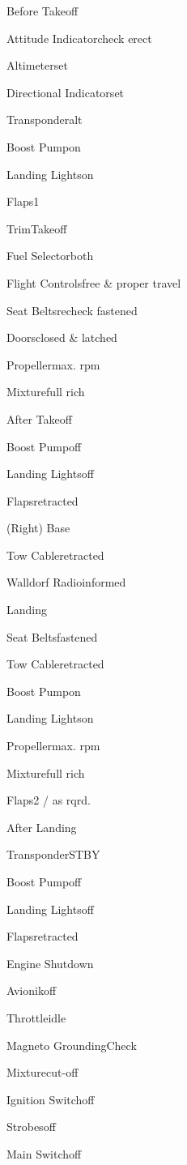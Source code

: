 \begin{checklist}{Before Takeoff}
  \item{Attitude Indicator}{check erect}
  \item{Altimeter}{set}
  \item{Directional Indicator}{set}
  \item{Transponder}{alt}
  \item{Boost Pump}{on}
  \item{Landing Lights}{on}
  \item{Flaps}{1}
  \item{Trim}{Takeoff}
  \item{Fuel Selector}{both}
  \item{Flight Controls}{free \& proper travel}
  \item{Seat Belts}{recheck fastened}
  \item{Doors}{closed \& latched}
  \item{Propeller}{max. rpm}
  \item{Mixture}{full rich}
\end{checklist}

\begin{checklist}{After Takeoff}
  \item{Boost Pump}{off}
  \item{Landing Lights}{off}
  \item{Flaps}{retracted}
\end{checklist}

\begin{checklist}{(Right) Base}
  \item{Tow Cable}{retracted}
  \item{Walldorf Radio}{informed}
\end{checklist}

\begin{checklist}{Landing}
  \item{Seat Belts}{fastened}
  \item{Tow Cable}{retracted}
  \item{Boost Pump}{on}
  \item{Landing Lights}{on}
  \item{Propeller}{max. rpm}
  \item{Mixture}{full rich}
  \item{Flaps}{2 / as rqrd.}
\end{checklist}

\begin{checklist}{After Landing}
  \item{Transponder}{STBY}
  \item{Boost Pump}{off}
  \item{Landing Lights}{off}
  \item{Flaps}{retracted}
\end{checklist}

\begin{checklist}{Engine Shutdown}
  \item{Avionik}{off}
  \item{Throttle}{idle}
  \item{Magneto Grounding}{Check}
  \item{Mixture}{cut-off}
  \item{Ignition Switch}{off}
  \item{Strobes}{off}
  \item{Main Switch}{off}
\end{checklist}

